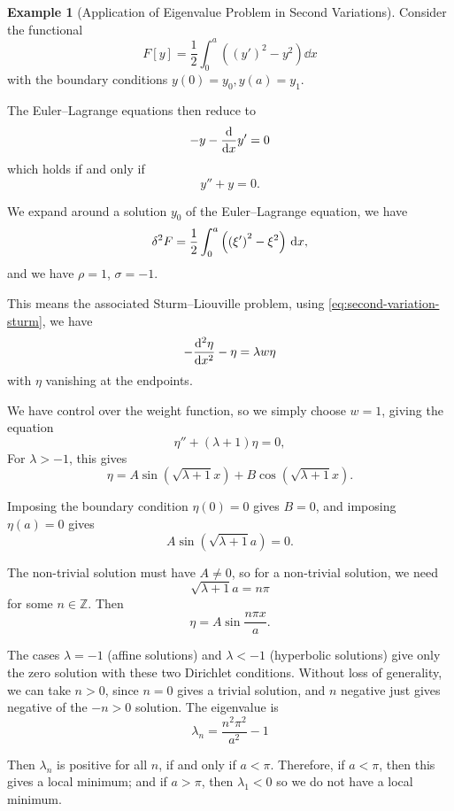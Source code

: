 \documentclass[11pt]{article}
\numberwithin{equation}{section}
\theoremstyle{definition}
\newtheorem{example}[theorem]{Example}
\theoremstyle{remark}
\newcommand{\pqty}[1]{\left(#1\right)}
\newcommand{\bqty}[1]{\left[#1\right]}
\newcommand{\ZZ}{\mathbb{Z}}
\begin{document}
\begin{example}[Application of Eigenvalue Problem in Second Variations]\label{variation-unit-0101}
    \label{ex:sturm-liouville-application-second-variation}%
    Consider the functional
    \[
        F\bqty{y} = \frac{1}{2} \int_{0}^{a} \pqty{\pqty{y'}^2 - y^2} \dd{x}
    \]
    with the boundary conditions \(y\pqty{0} = y_0, y\pqty{a} = y_1\).

    The Euler--Lagrange equations then reduce to
    \[
        -y - \dv{x} y' = 0
    \]
    which holds if and only if
    \[
        y'' + y = 0.
    \]

    We expand around a solution \(y_0\) of the Euler--Lagrange equation, we have
    \[
        \var[2]{F} = \frac{1}{2} \int_{0}^{a} \pqty{\pqty{\xi '}^2 - \xi^2} \dd{x},
    \]
    and we have \(\rho = 1\), \(\sigma = -1\).

    This means the associated Sturm--Liouville problem, using \autoref{eq:second-variation-sturm}, we have
    \[
        - \dv[2]{\eta}{x} - \eta = \lambda w \eta
    \]
    with \(\eta\) vanishing at the endpoints.

    We have control over the weight function, so we simply choose \(w = 1\), giving the equation
    \[
        \eta '' + \pqty{\lambda + 1} \eta = 0,
    \]
    For \(\lambda>-1\), this gives
    \[
        \eta = A \sin \pqty{\sqrt{\lambda + 1} x} + B \cos \pqty{\sqrt{\lambda + 1} x}.
    \]

    Imposing the boundary condition \(\eta\pqty{0} = 0\) gives \(B = 0\), and imposing \(\eta\pqty{a} = 0\) gives
    \[
        A \sin \pqty{\sqrt{\lambda + 1} a} = 0.
    \]

    The non-trivial solution must have \(A \neq 0\), so for a non-trivial solution, we need
    \[
        \sqrt{\lambda + 1} a = n \pi
    \]
    for some \(n \in \ZZ\). Then
    \[
        \eta = A \sin \frac{n \pi x}{a}.
    \]

    The cases \(\lambda=-1\) (affine solutions) and \(\lambda<-1\) (hyperbolic solutions) give only the zero solution with these two Dirichlet conditions. Without loss of generality, we can take \(n > 0\), since \(n = 0\) gives a trivial solution, and \(n\) negative just gives negative of the \(-n > 0\) solution. The eigenvalue is
    \[
        \lambda_n = \frac{n^2 \pi^2}{a^2} - 1
    \]

    Then \(\lambda_n\) is positive for all \(n\), if and only if \(a < \pi\). Therefore, if \(a < \pi\), then this gives a local minimum; and if \(a > \pi\), then \(\lambda_1 < 0\) so we do not have a local minimum.
\end{example}
\end{document}
